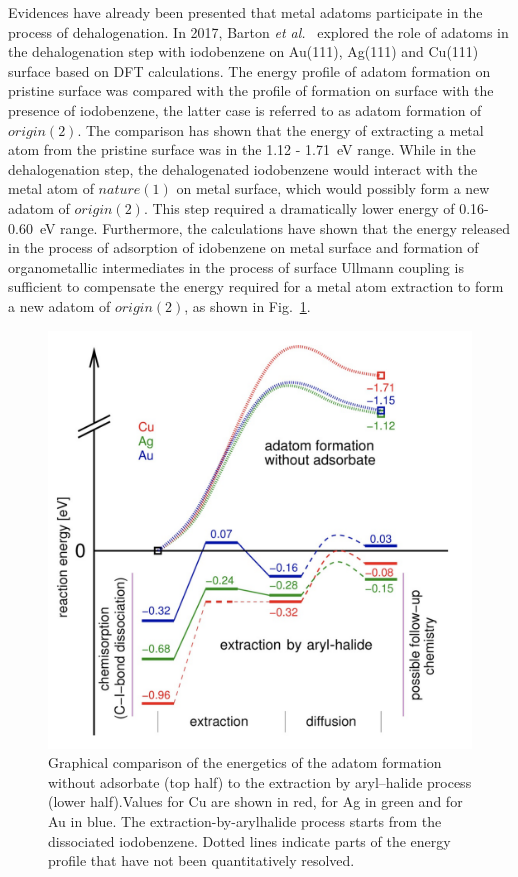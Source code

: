 \documentclass[%
 reprint,
 amsmath,amssymb,
 aps,
prb,
]{revtex4-2}
\begin{document}
Evidences have already been presented that metal adatoms participate in the process of dehalogenation. 
In 2017, Barton \textit{et al.}~\cite{chemeurope2017} explored the role of adatoms in the dehalogenation step with iodobenzene on Au(111), Ag(111) and Cu(111) surface based on DFT calculations. The energy profile of adatom formation on pristine surface was compared with the profile of formation on surface with the presence of iodobenzene, the latter case is referred to as adatom formation of $origin(2)$. The comparison has shown that the energy of extracting a metal atom from the pristine surface was in the 1.12 - 1.71~eV range. While in the dehalogenation step, the dehalogenated iodobenzene would interact with the metal atom of $nature(1)$ on metal surface, which would possibly form a new adatom of $origin(2)$. This step required a dramatically lower energy of 0.16-0.60~eV range. Furthermore, the calculations have shown that the energy released in the process of adsorption of idobenzene on metal surface and formation of organometallic intermediates in the process of surface Ullmann coupling is sufficient to compensate the energy required for a metal atom extraction to form a new adatom of $origin(2)$, as shown in Fig.~\ref{fig:3}.
\begin{figure}[htb]
\centering
\includegraphics[width=0.75\columnwidth]{Fig/Adatom-formation.png}
\caption{Graphical comparison of the energetics of the adatom formation without adsorbate (top half) to the extraction by aryl–halide process (lower half).Values for Cu are shown in red, for Ag in green and for Au in blue. The extraction-by-arylhalide process starts from the dissociated iodobenzene. Dotted lines indicate parts of the energy profile that have not been quantitatively resolved.}
\label{fig:3}
\end{figure}
\end{document}
